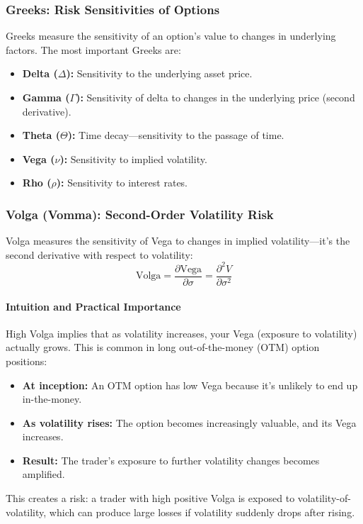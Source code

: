 \subsubsection{Greeks: Risk Sensitivities of Options}

Greeks measure the sensitivity of an option's value to changes in underlying factors. The most important Greeks are:

\begin{itemize}
    \item \textbf{Delta ($\Delta$):} Sensitivity to the underlying asset price.
    \item \textbf{Gamma ($\Gamma$):} Sensitivity of delta to changes in the underlying price (second derivative).
    \item \textbf{Theta ($\Theta$):} Time decay—sensitivity to the passage of time.
    \item \textbf{Vega ($\nu$):} Sensitivity to implied volatility.
    \item \textbf{Rho ($\rho$):} Sensitivity to interest rates.
\end{itemize}

\subsubsection{Volga (Vomma): Second-Order Volatility Risk}

Volga measures the sensitivity of Vega to changes in implied volatility—it's the second derivative with respect to volatility:
\begin{equation}
    \text{Volga} = \frac{\partial \text{Vega}}{\partial \sigma} = \frac{\partial^2 V}{\partial \sigma^2}
\end{equation}

\paragraph{Intuition and Practical Importance}

High Volga implies that as volatility increases, your Vega (exposure to volatility) actually grows. This is common in long out-of-the-money (OTM) option positions:

\begin{itemize}
    \item \textbf{At inception:} An OTM option has low Vega because it's unlikely to end up in-the-money.
    \item \textbf{As volatility rises:} The option becomes increasingly valuable, and its Vega increases.
    \item \textbf{Result:} The trader's exposure to further volatility changes becomes amplified.
\end{itemize}

This creates a risk: a trader with high positive Volga is exposed to volatility-of-volatility, which can produce large losses if volatility suddenly drops after rising.